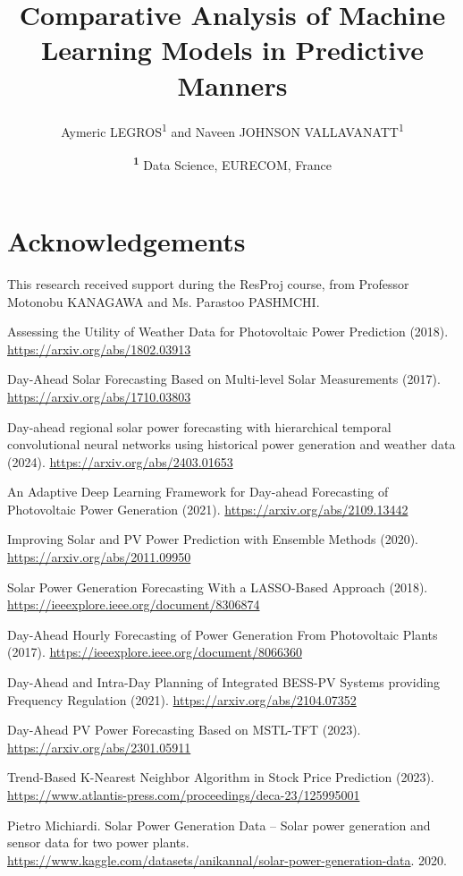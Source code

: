 \documentclass[twocolumn]{NobArticle}
\title{\centering Comparative Analysis of Machine Learning Models in Predictive Manners}
\author{\centering
    Aymeric LEGROS\textsuperscript{1}
    and Naveen JOHNSON VALLAVANATT\textsuperscript{1}
}
\date{\centering
    \textsuperscript{\textbf{1}}
    Data Science, EURECOM, France \\
}
\begin{document}
\small
\maketitle







\section*{Acknowledgements}
This research received support during the ResProj course, from Professor Motonobu KANAGAWA and Ms. Parastoo PASHMCHI.

\begin{thebibliography}{9}

Assessing the Utility of Weather Data for Photovoltaic Power Prediction (2018).
\url{https://arxiv.org/abs/1802.03913}

Day-Ahead Solar Forecasting Based on Multi-level Solar Measurements (2017).
\url{https://arxiv.org/abs/1710.03803}

Day-ahead regional solar power forecasting with hierarchical temporal convolutional neural networks using historical power generation and weather data (2024). 
\url{https://arxiv.org/abs/2403.01653}

An Adaptive Deep Learning Framework for Day-ahead Forecasting of Photovoltaic Power Generation (2021).
\url{https://arxiv.org/abs/2109.13442}

Improving Solar and PV Power Prediction with Ensemble Methods (2020).
\url{https://arxiv.org/abs/2011.09950}

Solar Power Generation Forecasting With a LASSO-Based Approach (2018).
\url{https://ieeexplore.ieee.org/document/8306874}

Day-Ahead Hourly Forecasting of Power Generation From Photovoltaic Plants (2017).
\url{https://ieeexplore.ieee.org/document/8066360}

Day-Ahead and Intra-Day Planning of Integrated BESS-PV Systems providing Frequency Regulation (2021).
\url{https://arxiv.org/abs/2104.07352}

Day-Ahead PV Power Forecasting Based on MSTL-TFT (2023).
\url{https://arxiv.org/abs/2301.05911}

Trend-Based K-Nearest Neighbor Algorithm in Stock Price Prediction (2023).
\url{https://www.atlantis-press.com/proceedings/deca-23/125995001}

Pietro Michiardi. Solar Power Generation Data – Solar power generation and sensor data for two power plants.
\url{https://www.kaggle.com/datasets/anikannal/solar-power-generation-data}.
2020.

\end{thebibliography}
\end{document}
